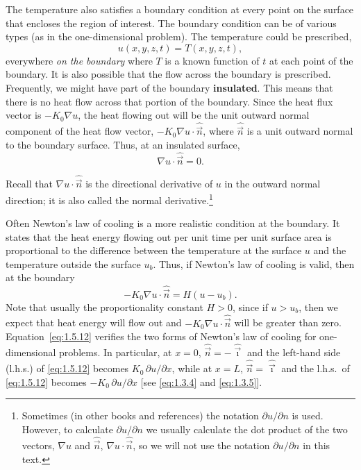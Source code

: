 The temperature also satisfies a boundary condition at every point on the surface that encloses the region of interest. The boundary condition can be of various types (as in the one-dimensional problem). The temperature could be prescribed,
\[
u(x,y,z,t) = T(x,y,z,t),
\]
everywhere \emph{on the boundary} where $T$ is a known function of $t$ at each point of the boundary. It is also possible that the flow across the boundary is prescribed. Frequently, we might have part of the boundary \textbf{insulated}. This means that there is no heat flow across that portion of the boundary. Since the heat flux vector is $-K_0\nabla u$, the heat flowing out will be the unit outward normal component of the heat flow vector, $-K_0\nabla u\cdot\hat{\vec{n}}$, where $\hat{\vec{n}}$ is a unit outward normal to the boundary surface. Thus, at an insulated surface,
\[
\nabla u\cdot\hat{\vec{n}} = 0.
\]

Recall that $\nabla u\cdot\hat{\vec{n}}$ is the directional derivative of $u$ in the outward normal direction; it is also called the normal derivative.\footnote{Sometimes (in other books and references) the notation $\partial u/\partial n$ is used. However, to calculate $\partial u/\partial n$ we usually calculate the dot product of the two vectors, $\nabla u$ and $\hat{\vec{n}}$, $\nabla u\cdot\hat{\vec{n}}$, so we will not use the notation $\partial u/\partial n$ in this text.}

Often Newton's law of cooling is a more realistic condition at the boundary. It states that the heat energy flowing out per unit time per unit surface area is proportional to the difference between the temperature at the surface $u$ and the temperature outside the surface $u_b$. Thus, if Newton's law of cooling is valid, then at the boundary
\begin{equation}
-K_0\nabla u\cdot\hat{\vec{n}} = H(u - u_b).
\label{eq:1.5.12}
\end{equation}
Note that usually the proportionality constant $H > 0$, since if $u > u_b$, then we expect that heat energy will flow out and $-K_0\nabla u\cdot\hat{\vec{n}}$ will be greater than zero. Equation~\eqref{eq:1.5.12} verifies the two forms of Newton's law of cooling for one-dimensional problems. In particular, at $x = 0$, $\hat{\vec{n}} = -\hat{\vec{\imath}}$ and the left-hand side (l.h.s.) of \eqref{eq:1.5.12} becomes $K_0\,\partial u/\partial x$, while at $x = L$, $\hat{\vec{n}} = \hat{\vec{\imath}}$ and the l.h.s.\ of \eqref{eq:1.5.12} becomes $-K_0\,\partial u/\partial x$ [see \eqref{eq:1.3.4} and \eqref{eq:1.3.5}].


